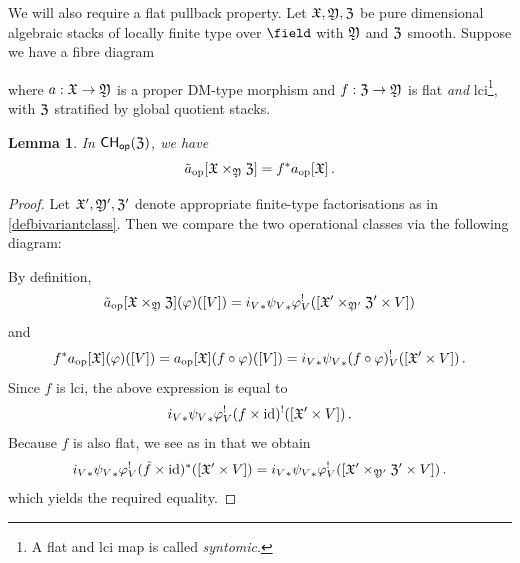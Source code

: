 \documentclass[a4paper,12pt]{article} %
\newcommand{\on}[1]{\operatorname{#1}}
\theoremstyle{definition}
\theoremstyle{plain}%
\newtheorem{lemma}[definition]{Lemma}
\renewcommand{\phi}{\varphi}
\newcommand{\Chow}{\mathsf{CH}}
\newcommand{\CHop}{\Chow_{\mathsf{op}}}
\begin{document}
We will also require a flat pullback property.
Let $\frak X, \frak Y, \frak Z$ be pure dimensional algebraic stacks of locally finite type over ${\field}$  with $\frak Y$ and $\frak Z$ smooth. 
Suppose we have a fibre diagram
\begin{center}
\end{center}
where  $a: \frak X \to \frak Y$ is a proper DM-type morphism and $f: \frak Z \to \frak Y$ is flat {\em and} lci\footnote{A flat and lci map is called {\em syntomic}.}, with $\frak Z$ stratified by global quotient stacks. 
\begin{lemma}\label{lem:pushpullcommutes}
In $\CHop(\frak Z)$, we have
$$\tilde{a}_{\on{op}} [\frak X \times_{\frak Y} \frak Z] = f^* a_{\on{op}}[\frak X]\, .$$
\end{lemma}

\begin{proof}
Let $\frak X', \frak Y', \frak Z'$ denote appropriate finite-type factorisations as in \cref{defbivariantclass}. Then we compare the two operational classes via the following diagram:
\begin{center}
\end{center}
By definition,
\[\tilde{a}_{\on{op}} [\frak X \times_{\frak Y} \frak Z] (\phi)([V]) = {i_V}_* {\psi_V}_* \phi_V^! ([\frak X'\times_{\frak Y'} \frak Z' \times V]) \]
and
\[f^* a_{\on{op}}[\frak X](\phi)([V]) = a_{\on{op}}[\frak X](f \circ \phi)([V])  = {i_V}_* {\psi_V}_* (f \circ \phi)_V^! ([\frak X'\times V])\, .\]
Since $f$ is lci, the above expression is equal to 
\[{i_V}_* {\psi_V}_* \phi_V^! (f \times \on{id})^! ([\frak X'\times V])\, .\]
Because $f$ is also flat, we see as in  \cite[Prop 6.6(b)]{Fulton1984Intersection-th} that we obtain
\[{i_V}_* {\psi_V}_* \phi_V^! (\tilde{f} \times \on{id})^* ([\frak X'\times V]) = {i_V}_* {\psi_V}_* \phi_V^! ([\frak X' \times_{\frak Y'} \frak Z' \times V])\, . \]
which yields the required equality. 
\end{proof}
\end{document}
